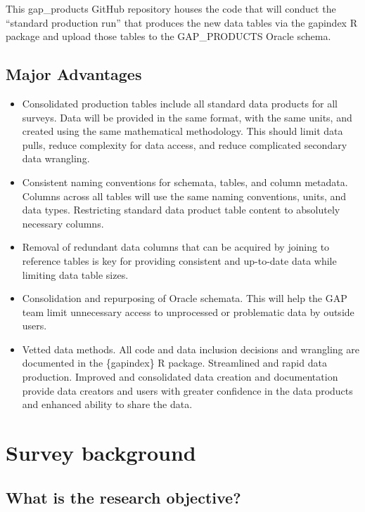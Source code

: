 \documentclass[
  letterpaper,
  oneside,
  open=any]{scrbook}
\begin{document}
This gap\_products GitHub repository houses the code that will conduct
the ``standard production run'' that produces the new data tables via
the gapindex R package and upload those tables to the GAP\_PRODUCTS
Oracle schema.

\hypertarget{major-advantages}{%
\section*{Major Advantages}\label{major-advantages}}


\begin{itemize}
\item
  Consolidated production tables include all standard data products for
  all surveys. Data will be provided in the same format, with the same
  units, and created using the same mathematical methodology. This
  should limit data pulls, reduce complexity for data access, and reduce
  complicated secondary data wrangling.
\item
  Consistent naming conventions for schemata, tables, and column
  metadata. Columns across all tables will use the same naming
  conventions, units, and data types. Restricting standard data product
  table content to absolutely necessary columns.
\item
  Removal of redundant data columns that can be acquired by joining to
  reference tables is key for providing consistent and up-to-date data
  while limiting data table sizes.
\item
  Consolidation and repurposing of Oracle schemata. This will help the
  GAP team limit unnecessary access to unprocessed or problematic data
  by outside users.
\item
  Vetted data methods. All code and data inclusion decisions and
  wrangling are documented in the \{gapindex\} R package. Streamlined
  and rapid data production. Improved and consolidated data creation and
  documentation provide data creators and users with greater confidence
  in the data products and enhanced ability to share the data.
\end{itemize}

\hypertarget{survey-background}{%
\chapter{Survey background}\label{survey-background}}

\hypertarget{what-is-the-research-objective}{%
\section{What is the research
objective?}\label{what-is-the-research-objective}}
\end{document}
